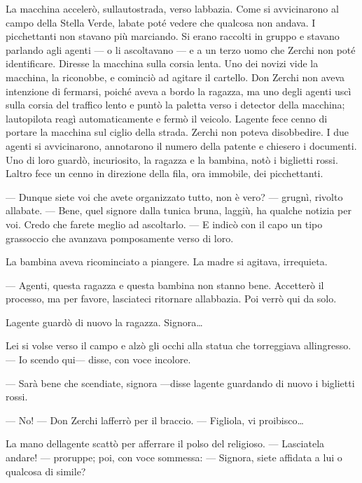 La macchina accelerò, sull\textquotesingle autostrada, verso
l\textquotesingle abbazia. Come si avvicinarono al campo della Stella
Verde, l\textquotesingle abate poté vedere che qualcosa non andava. I
picchettanti non stavano più marciando. Si erano raccolti in gruppo e
stavano parlando agli agenti --- o li ascoltavano --- e a un terzo uomo
che Zerchi non poté identificare. Diresse la macchina sulla corsia
lenta. Uno dei novizi vide la macchina, la riconobbe, e cominciò ad
agitare il cartello. Don Zerchi non aveva intenzione di fermarsi, poiché
aveva a bordo la ragazza, ma uno degli agenti uscì sulla corsia del
traffico lento e puntò la paletta verso i detector della macchina;
l\textquotesingle autopilota reagì automaticamente e fermò il veicolo.
L\textquotesingle agente fece cenno di portare la macchina sul ciglio
della strada. Zerchi non poteva disobbedire. I due agenti si
avvicinarono, annotarono il numero della patente e chiesero i documenti.
Uno di loro guardò, incuriosito, la ragazza e la bambina, notò i
biglietti rossi. L\textquotesingle altro fece un cenno in direzione
della fila, ora immobile, dei picchettanti.

--- Dunque siete voi che avete organizzato tutto, non è vero? ---
grugnì, rivolto all\textquotesingle abate. --- Bene, quel signore dalla
tunica bruna, laggiù, ha qualche notizia per voi. Credo che farete
meglio ad ascoltarlo. --- E indicò con il capo un tipo grassoccio che
avanzava pomposamente verso di loro.

La bambina aveva ricominciato a piangere. La madre si agitava,
irrequieta.

--- Agenti, questa ragazza e questa bambina non stanno bene. Accetterò
il processo, ma per favore, lasciateci ritornare
all\textquotesingle abbazia. Poi verrò qui da solo.

L\textquotesingle agente guardò di nuovo la ragazza. Signora\ldots{}

Lei si volse verso il campo e alzò gli occhi alla statua che torreggiava
all\textquotesingle ingresso. --- Io scendo qui--- disse, con voce
incolore.

--- Sarà bene che scendiate, signora ---disse l\textquotesingle agente
guardando di nuovo i biglietti rossi.

--- No! --- Don Zerchi l\textquotesingle afferrò per il braccio. ---
Figliola, vi proibisco\ldots{}

La mano dell\textquotesingle agente scattò per afferrare il polso del
religioso. --- Lasciatela andare! --- proruppe; poi, con voce sommessa:
--- Signora, siete affidata a lui o qualcosa di simile?

